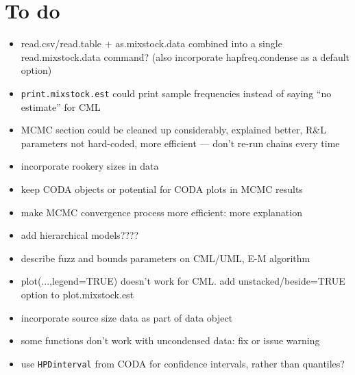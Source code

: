 \documentclass[11pt]{article}
\begin{document}
\section{To do}
\begin{itemize}
\item{read.csv/read.table + as.mixstock.data combined
into a single read.mixstock.data command? (also incorporate
hapfreq.condense as a default option)}
\item{{\tt print.mixstock.est} could print sample frequencies instead of
saying ``no estimate'' for CML}
\item{MCMC section could be cleaned up considerably, explained better,
R\&L parameters not hard-coded, more efficient --- don't
re-run chains every time}
\item{incorporate rookery sizes in data}
\item{keep CODA objects or potential for CODA plots in MCMC results}
\item{make MCMC convergence process more efficient: more explanation}
\item{add hierarchical models????}
\item{describe fuzz and bounds parameters on CML/UML,
E-M algorithm}
\item{plot(...,legend=TRUE) doesn't work for CML.
add unstacked/beside=TRUE option to plot.mixstock.est}
\item incorporate source size data as part of data object
\item some functions don't work with uncondensed data: fix or issue warning
\item use {\tt HPDinterval} from CODA for confidence intervals,
  rather than quantiles?
\end{itemize}


\end{document}
